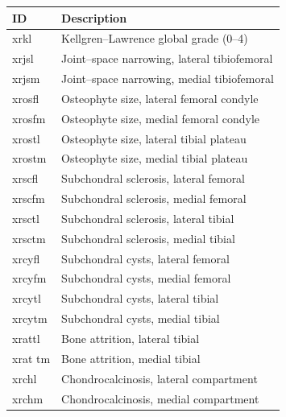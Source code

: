 \begin{tabular}{ll}\toprule
ID & Description\\\midrule
xrkl & Kellgren--Lawrence global grade (0--4) \\
xrjsl & Joint–space narrowing, lateral tibiofemoral \\
xrjsm & Joint–space narrowing, medial tibiofemoral \\
xrosfl & Osteophyte size, lateral femoral condyle \\
xrosfm & Osteophyte size, medial femoral condyle \\
xrostl & Osteophyte size, lateral tibial plateau \\
xrostm & Osteophyte size, medial tibial plateau \\
xrscfl & Subchondral sclerosis, lateral femoral \\
xrscfm & Subchondral sclerosis, medial femoral \\
xrsctl & Subchondral sclerosis, lateral tibial \\
xrsctm & Subchondral sclerosis, medial tibial \\
xrcyfl & Subchondral cysts, lateral femoral \\
xrcyfm & Subchondral cysts, medial femoral \\
xrcytl & Subchondral cysts, lateral tibial \\
xrcytm & Subchondral cysts, medial tibial \\
xrattl & Bone attrition, lateral tibial \\
xrat tm & Bone attrition, medial tibial \\
xrchl & Chondrocalcinosis, lateral compartment \\
xrchm & Chondrocalcinosis, medial compartment \\
\bottomrule\end{tabular}
